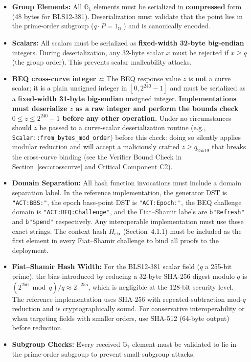 \documentclass[11pt]{article}
\theoremstyle{definitionstyle}
\theoremstyle{plain}
\begin{document}
\begin{itemize}[leftmargin=*]
\item \textbf{Group Elements:} All $\mathbb{G}_1$ elements must be serialized in \textbf{compressed} form (48 bytes for BLS12-381). Deserialization must validate that the point lies in the prime-order subgroup ($q \cdot P = 1_{\mathbb{G}_1}$) and is canonically encoded.
\item \textbf{Scalars:} All scalars must be serialized as \textbf{fixed-width 32-byte big-endian} integers. During deserialization, any 32-byte scalar $x$ must be rejected if $x \ge q$ (the group order). This prevents scalar malleability attacks.
\item \textbf{BEQ cross-curve integer $z$:} The BEQ response value $z$ is \textbf{not} a curve scalar; it is a plain unsigned integer in $[0, 2^{240}-1]$ and must be serialized as a \textbf{fixed-width 31-byte big-endian} unsigned integer.  \textbf{Implementations must deserialize $z$ as a raw integer and perform the bounds check $0 \le z \le 2^{240}-1$ before any other operation.}  Under no circumstances should $z$ be passed to a curve-scalar deserialization routine (e.g., \texttt{Scalar::from\_bytes\_mod\_order}) before this check: doing so silently applies modular reduction and will accept a maliciously crafted $z \ge q_{25519}$ that breaks the cross-curve binding (see the Verifier Bound Check in Section~\ref{sec:crosscurve} and Critical Component C2).
\item \textbf{Domain Separation:} All hash function invocations must include a domain separation label. In the reference implementation, the generator DST is \texttt{"ACT:BBS:"}, the epoch base-point DST is \texttt{"ACT:Epoch:"}, the BEQ challenge domain is \texttt{"ACT:BEQ:Challenge"}, and the Fiat--Shamir labels are \texttt{b"Refresh"} and \texttt{b"Spend"} respectively. Any interoperable implementation must use these exact strings. The context hash $H_{\mathsf{ctx}}$ (Section~4.1.1) must be included as the first element in every Fiat--Shamir challenge to bind all proofs to the deployment.
\item \textbf{Fiat--Shamir Hash Width:} For the BLS12-381 scalar field ($q$ a 255-bit prime), the bias introduced by reducing a 32-byte SHA-256 digest modulo $q$ is $(2^{256} \bmod q)/q \approx 2^{-255}$, which is negligible at the 128-bit security level. The reference implementation uses SHA-256 with repeated-subtraction mod-$q$ reduction and is cryptographically sound. For conservative interoperability or when targeting fields with smaller orders, use SHA-512 (64-byte output) before reduction.
\item \textbf{Subgroup Checks:} Every received $\mathbb{G}_1$ element must be validated to lie in the prime-order subgroup to prevent small-subgroup attacks.
\end{itemize}
\end{document}
